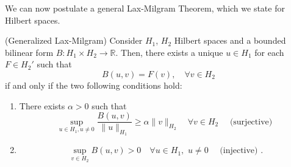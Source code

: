 We can now postulate a general Lax-Milgram Theorem, which we state for Hilbert spaces.
\begin{theorem}(Generalized Lax-Milgram)
    Consider $H_1$, $H_2$ Hilbert spaces and a bounded bilinear form $B:H_1\times H_2 \to \mathbb{R}$. Then, there exists a unique $u\in H_1$ for each $F\in H_2'$ such that 
    \begin{equation}
        B(u,v) = F(v),\quad \forall v \in H_2
    \end{equation} 
    if and only if the two following conditions hold:
    \begin{enumerate}
        \item There exists $\alpha > 0$ such that 
        \begin{equation}
            \sup_{u\in H_1,u\neq 0} \frac{B(u,v)}{\| u \|_{H_1}} \ge \alpha \| v \|_{H_2} \quad \forall v\in H_2\quad \text{ (surjective) }
        \end{equation}
        \item 
        \begin{equation}
        \sup_{v\in H_2} B(u,v) > 0 \quad \forall u\in H_1,\,\, u\neq 0 \quad \text{ (injective) }.
        \end{equation}
    \end{enumerate}
\end{theorem}

